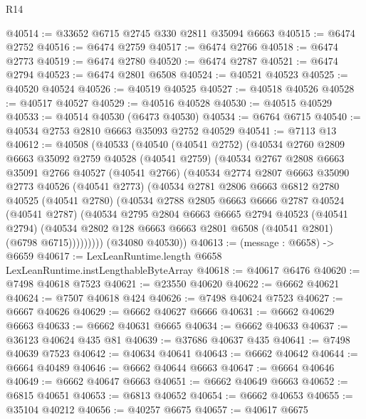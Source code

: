 \begin{lexlean}{R14}
\begin{coremodule}
@40514 := @33652 @6715 @2745 @330 @2811 @35094 @6663
@40515 := @6474 @2752
@40516 := @6474 @2759
@40517 := @6474 @2766
@40518 := @6474 @2773
@40519 := @6474 @2780
@40520 := @6474 @2787
@40521 := @6474 @2794
@40523 := @6474 @2801 @6508
@40524 := @40521 @40523
@40525 := @40520 @40524
@40526 := @40519 @40525
@40527 := @40518 @40526
@40528 := @40517 @40527
@40529 := @40516 @40528
@40530 := @40515 @40529
@40533 := @40514 @40530 (@6473 @40530)
@40534 := @6764 @6715
@40540 := @40534 @2753 @2810 @6663 @35093 @2752 @40529
@40541 := @7113 @13
@40612 := @40508
    (@40533
      (@40540
        (@40541 @2752)
        (@40534
          @2760
          @2809
          @6663
          @35092
          @2759
          @40528
          (@40541 @2759)
          (@40534
            @2767
            @2808
            @6663
            @35091
            @2766
            @40527
            (@40541 @2766)
            (@40534
              @2774
              @2807
              @6663
              @35090
              @2773
              @40526
              (@40541 @2773)
              (@40534
                @2781
                @2806
                @6663
                @6812
                @2780
                @40525
                (@40541 @2780)
                (@40534
                  @2788
                  @2805
                  @6663
                  @6666
                  @2787
                  @40524
                  (@40541 @2787)
                  (@40534
                    @2795
                    @2804
                    @6663
                    @6665
                    @2794
                    @40523
                    (@40541 @2794)
                    (@40534 @2802 @128 @6663 @6663 @2801 @6508 (@40541 @2801) (@6798 @6715)))))))))
      (@34080 @40530))
@40613 := (message : @6658) -> @6659
@40617 := LexLeanRuntime.length @6658 LexLeanRuntime.instLengthableByteArray
@40618 := @40617 @6476
@40620 := @7498 @40618 @7523
@40621 := @23550 @40620
@40622 := @6662 @40621
@40624 := @7507 @40618 @424
@40626 := @7498 @40624 @7523
@40627 := @6667 @40626
@40629 := @6662 @40627 @6666
@40631 := @6662 @40629 @6663
@40633 := @6662 @40631 @6665
@40634 := @6662 @40633
@40637 := @36123 @40624 @435 @81
@40639 := @37686 @40637 @435
@40641 := @7498 @40639 @7523
@40642 := @40634 @40641
@40643 := @6662 @40642
@40644 := @6664 @40489
@40646 := @6662 @40644 @6663
@40647 := @6664 @40646
@40649 := @6662 @40647 @6663
@40651 := @6662 @40649 @6663
@40652 := @6815 @40651
@40653 := @6813 @40652
@40654 := @6662 @40653
@40655 := @35104 @40212
@40656 := @40257 @6675
@40657 := @40617 @6675

\end{coremodule}
\end{lexlean}
